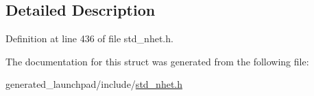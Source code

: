 \subsection{Detailed Description}


Definition at line 436 of file std\+\_\+nhet.\+h.



The documentation for this struct was generated from the following file\+:\begin{DoxyCompactItemize}
\item 
generated\+\_\+launchpad/include/\mbox{\hyperlink{std__nhet_8h}{std\+\_\+nhet.\+h}}\end{DoxyCompactItemize}
